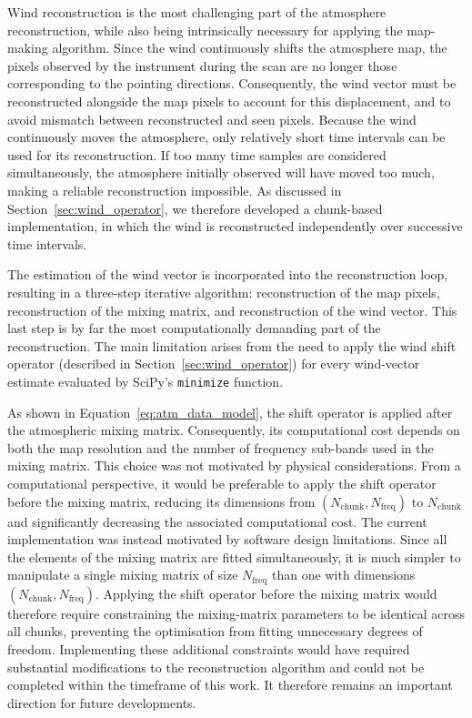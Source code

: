 \documentclass[a4paper,11pt]{article}
\begin{document}
Wind reconstruction is the most challenging part of the atmosphere reconstruction, while also being intrinsically necessary for applying the map-making algorithm. Since the wind continuously shifts the atmosphere map, the pixels observed by the instrument during the scan are no longer those corresponding to the pointing directions. Consequently, the wind vector must be reconstructed alongside the map pixels to account for this displacement, and to avoid mismatch between reconstructed and seen pixels.
Because the wind continuously moves the atmosphere, only relatively short time intervals can be used for its reconstruction. If too many time samples are considered simultaneously, the atmosphere initially observed will have moved too much, making a reliable reconstruction impossible. As discussed in Section~\ref{sec:wind_operator}, we therefore developed a chunk-based implementation, in which the wind is reconstructed independently over successive time intervals.

The estimation of the wind vector is incorporated into the reconstruction loop, resulting in a three-step iterative algorithm: reconstruction of the map pixels, reconstruction of the mixing matrix, and reconstruction of the wind vector. This last step is by far the most computationally demanding part of the reconstruction. The main limitation arises from the need to apply the wind shift operator (described in Section~\ref{sec:wind_operator}) for every wind-vector estimate evaluated by SciPy's \texttt{minimize} function.

As shown in Equation~\ref{eq:atm_data_model}, the shift operator is applied after the atmospheric mixing matrix. Consequently, its computational cost depends on both the map resolution and the number of frequency sub-bands used in the mixing matrix. This choice was not motivated by physical considerations. From a computational perspective, it would be preferable to apply the shift operator before the mixing matrix, reducing its dimensions from $\left(N_\text{chunk}, N_\text{freq}\right)$ to $N_\text{chunk}$ and significantly decreasing the associated computational cost.
The current implementation was instead motivated by software design limitations. Since all the elements of the mixing matrix are fitted simultaneously, it is much simpler to manipulate a single mixing matrix of size $N_\text{freq}$ than one with dimensions $\left(N_\text{chunk}, N_\text{freq}\right)$. Applying the shift operator before the mixing matrix would therefore require constraining the mixing-matrix parameters to be identical across all chunks, preventing the optimisation from fitting unnecessary degrees of freedom. Implementing these additional constraints would have required substantial modifications to the reconstruction algorithm and could not be completed within the timeframe of this work. It therefore remains an important direction for future developments.
\end{document}
